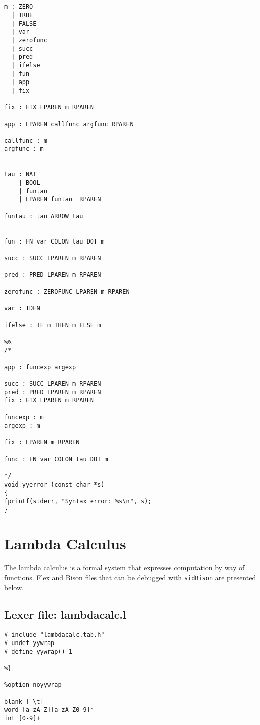\begin{appendices}
\begin{Verbatim}[frame=single]
%%


m : ZERO
  | TRUE
  | FALSE
  | var
  | zerofunc
  | succ
  | pred
  | ifelse
  | fun
  | app
  | fix

fix : FIX LPAREN m RPAREN

app : LPAREN callfunc argfunc RPAREN

callfunc : m
argfunc : m


tau : NAT
    | BOOL
    | funtau
    | LPAREN funtau  RPAREN

funtau : tau ARROW tau


fun : FN var COLON tau DOT m

succ : SUCC LPAREN m RPAREN

pred : PRED LPAREN m RPAREN

zerofunc : ZEROFUNC LPAREN m RPAREN

var : IDEN

ifelse : IF m THEN m ELSE m

%%
/*

app : funcexp argexp

succ : SUCC LPAREN m RPAREN
pred : PRED LPAREN m RPAREN
fix : FIX LPAREN m RPAREN

funcexp : m
argexp : m

fix : LPAREN m RPAREN

func : FN var COLON tau DOT m

*/
void yyerror (const char *s)
{
fprintf(stderr, "Syntax error: %s\n", s);
}
\end{Verbatim}

\section{Lambda Calculus}
\label{appendix:lambdacalc}
The lambda calculus is a formal system that expresses computation by way of functions. Flex and Bison files that can be debugged with \verb|sidBison| are presented below.

\subsection{Lexer file: lambdacalc.l}

\begin{Verbatim}[frame=single]
%{
# include "lambdacalc.tab.h"
# undef yywrap
# define yywrap() 1

%}

%option noyywrap

blank [ \t]
word [a-zA-Z][a-zA-Z0-9]*
int [0-9]+



\end{Verbatim}
\end{appendices}
